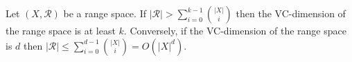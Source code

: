 \begin{lemma}
Let \((X, \mathcal{R})\) be a range space.
If \(| \mathcal{R} | > \sum_{i=0}^{k-1} {| X | \choose i} \)
then the VC-dimension of the range space is at least \(k\).
Conversely, if the VC-dimension of the range space is \(d\) then
\(| \mathcal{R} | \leq \sum_{i=0}^{d-1} {| X | \choose i} = O({| X |}^d)\).
\end{lemma}
